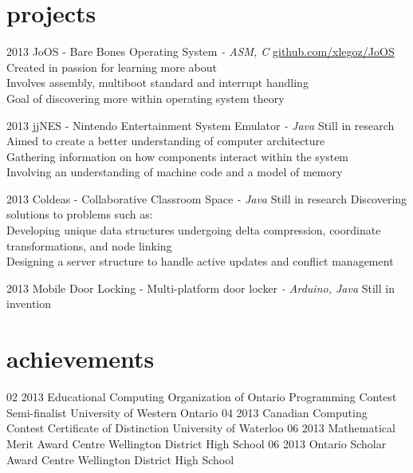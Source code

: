 \documentclass[]{friggeri-cv}
\begin{document}
\section{projects}

\begin{entrylist}
  \entry
    {2013}
    {JoOS \textsf{- Bare Bones Operating System \em{- ASM, C}}}
    {\href{http://github.com/xlegoz/JoOS}{github.com/xlegoz/JoOS}}
    {Created in passion for learning more about  \\
    Involves assembly, multiboot  standard and interrupt handling \\
    Goal of discovering more within operating system theory}
    
  \entry
  	{2013}
  	{jjNES \textsf{- Nintendo Entertainment System Emulator \em{- Java}}}
  	{Still in research}
  	{Aimed to create a better understanding of computer architecture \\
  	Gathering information on how components interact within the system \\
  	Involving an understanding of machine code and a model of memory}
  	
  \entry
  	{2013}
  	{Coldeas \textsf{- Collaborative Classroom Space \em{- Java}}}
  	{Still in research}
  	{Discovering solutions to problems such as: \\
  	\hspace{70mm}
  	 Developing unique data structures undergoing delta compression, coordinate transformations, and node linking \\
  	 Designing a server structure to handle active updates and conflict management }
  
  \entry
  	{2013}
  	{Mobile Door Locking \textsf{- Multi-platform door locker \em{- Arduino, Java}}}
  	{Still in invention}
  	{}
\end{entrylist}

\section{achievements}

\begin{entrylist}
  \entry
  	{02 2013}
  	{Educational Computing Organization of Ontario Programming Contest Semi-finalist}
  	{University of Western Ontario}
  	{}
  \entry
	{04 2013}  	
  	{Canadian Computing Contest Certificate of Distinction}
  	{University of Waterloo}
  	{}
  \entry
  	{06 2013}
  	{Mathematical Merit Award}
  	{Centre Wellington District High School}
  	{}
  \entry
  	{06 2013}
  	{Ontario Scholar Award}
  	{Centre Wellington District High School}
  	{}

\end{entrylist}
\end{document}
